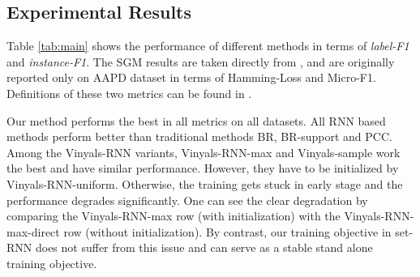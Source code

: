 

\subsection{Experimental Results}

Table \ref{tab:main} shows the performance of different methods in terms of \emph{label-F1} and \emph{instance-F1}. The SGM results are taken directly from \cite{DBLP:journals/corr/abs-1806-04822}, and are originally reported only on AAPD dataset in terms of Hamming-Loss and Micro-F1. Definitions of these two metrics can be found in \cite{koyejo2015consistent}.  

 
Our method performs the best in all metrics on all datasets. All RNN based methods perform better than traditional methods BR, BR-support and PCC. Among the Vinyals-RNN variants, Vinyals-RNN-max and Vinyals-sample work the best and have similar performance. However, they have to be initialized by Vinyals-RNN-uniform. Otherwise, the training gets stuck in early stage and the performance degrades significantly. One can see the clear degradation by comparing the Vinyals-RNN-max row (with initialization) with the Vinyals-RNN-max-direct row (without initialization). By contrast, our training objective in set-RNN does not suffer from this issue and can serve as a stable stand alone training objective.

